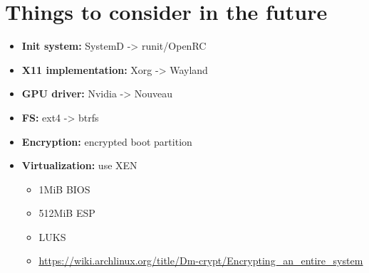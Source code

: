 \documentclass[10pt, a4paper, onecolumn, openany]{book} %
\begin{document}
\chapter{Things to consider in the future}
\begin{itemize}
    \item \textbf{Init system:} SystemD -> runit/OpenRC
    \item \textbf{X11 implementation:} Xorg -> Wayland
    \item \textbf{GPU driver:} Nvidia -> Nouveau
    \item \textbf{FS:} ext4 -> btrfs
    \item \textbf{Encryption:} encrypted boot partition
    \item \textbf{Virtualization:} use XEN
    \begin{itemize}
        \item 1MiB BIOS
        \item 512MiB ESP
        \item LUKS
        \item \underline{\url{https://wiki.archlinux.org/title/Dm-crypt/Encrypting_an_entire_system}}
    \end{itemize}
\end{itemize}

\end{document}
